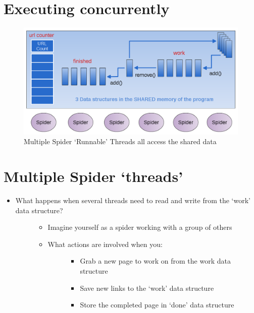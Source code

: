 \documentclass[letterpaper,10pt,openany,oneside]{sphinxmanual}
\begin{document}
\section{Executing concurrently}
\label{URLSpider/URLSpider:executing-concurrently}\begin{figure}[htbp]
\centering
\capstart

\includegraphics{Spider2.png}
\caption{Multiple Spider ‘Runnable’ Threads all access the shared data}\end{figure}


\section{Multiple Spider `threads'}
\label{URLSpider/URLSpider:multiple-spider-threads}\begin{itemize}
\item {} \begin{description}
\item[{What happens when several threads need to read and write from the ‘work’ data structure?}] \leavevmode\begin{itemize}
\item {} 
Imagine yourself as a spider working with a group of others

\item {} \begin{description}
\item[{What actions are involved when you:}] \leavevmode\begin{itemize}
\item {} 
Grab a new page to work on from the work data structure

\item {} 
Save new links to the ‘work’ data structure

\item {} 
Store the completed page in ‘done’ data structure

\end{itemize}

\end{description}

\end{itemize}

\end{description}

\end{itemize}
\end{document}
